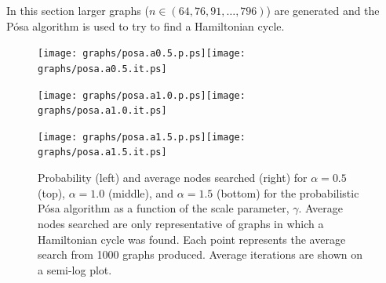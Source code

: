 \documentclass[twoside,11pt]{article}
\begin{document}
In this section larger graphs ($n \in (64, 76, 91, \dots, 796)$) are generated and the P\'osa algorithm
is used to try to find a Hamiltonian cycle.  
%
%
%
%

\begin{figure}
  \centering
  \texttt{[image: graphs/posa.a0.5.p.ps]}\texttt{[image: graphs/posa.a0.5.it.ps]}

  \label{fig:posa_a5}

  \texttt{[image: graphs/posa.a1.0.p.ps]}\texttt{[image: graphs/posa.a1.0.it.ps]}

  \label{fig:posa_a1}


\texttt{[image: graphs/posa.a1.5.p.ps]}\texttt{[image: graphs/posa.a1.5.it.ps]}


  \caption{ 
    Probability (left) and average nodes searched (right) for $\alpha=0.5$ (top), $\alpha=1.0$ (middle), and $\alpha=1.5$ (bottom) for the probabilistic P\'osa algorithm 
    as a function of the scale parameter, $\gamma$.  
    Average nodes searched are only
    representative of graphs in which a Hamiltonian cycle was found.  
    Each point represents the average search from 1000 graphs produced. 
    Average iterations are shown on a semi-log plot.
  }
\label{fig:posa_a15}
\end{figure}
\end{document}
